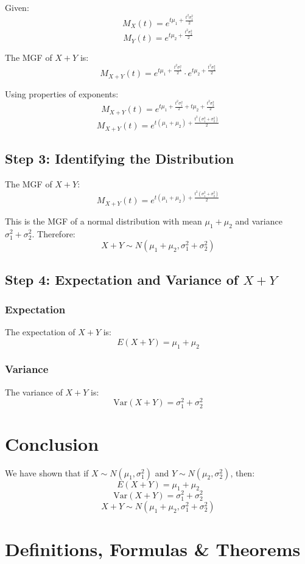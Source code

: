 \documentclass[12pt]{article}
\begin{document}
Given:
\[ M_X(t) = e^{t\mu_1 + \frac{t^2\sigma_1^2}{2}} \]
\[ M_Y(t) = e^{t\mu_2 + \frac{t^2\sigma_2^2}{2}} \]

The MGF of \( X + Y \) is:
\[ M_{X+Y}(t) = e^{t\mu_1 + \frac{t^2\sigma_1^2}{2}} \cdot e^{t\mu_2 + \frac{t^2\sigma_2^2}{2}} \]

Using properties of exponents:
\[ M_{X+Y}(t) = e^{t\mu_1 + \frac{t^2\sigma_1^2}{2} + t\mu_2 + \frac{t^2\sigma_2^2}{2}} \]
\[ M_{X+Y}(t) = e^{t(\mu_1 + \mu_2) + \frac{t^2(\sigma_1^2 + \sigma_2^2)}{2}} \]

\subsection*{Step 3: Identifying the Distribution}
The MGF of \( X + Y \):
\[ M_{X+Y}(t) = e^{t(\mu_1 + \mu_2) + \frac{t^2(\sigma_1^2 + \sigma_2^2)}{2}} \]

This is the MGF of a normal distribution with mean \( \mu_1 + \mu_2 \) and variance \( \sigma_1^2 + \sigma_2^2 \). Therefore:
\[ X + Y \sim N(\mu_1 + \mu_2, \sigma_1^2 + \sigma_2^2) \]

\subsection*{Step 4: Expectation and Variance of \( X + Y \)}
\subsubsection*{Expectation}
The expectation of \( X + Y \) is:
\[ E(X + Y) = \mu_1 + \mu_2 \]

\subsubsection*{Variance}
The variance of \( X + Y \) is:
\[ \text{Var}(X + Y) = \sigma_1^2 + \sigma_2^2 \]

\section*{Conclusion}
We have shown that if \( X \sim N(\mu_1, \sigma_1^2) \) and \( Y \sim N(\mu_2, \sigma_2^2) \), then:
\[ E(X + Y) = \mu_1 + \mu_2 \]
\[ \text{Var}(X + Y) = \sigma_1^2 + \sigma_2^2 \]
\[ X + Y \sim N(\mu_1 + \mu_2, \sigma_1^2 + \sigma_2^2) \]

\newpage
\section*{Definitions, Formulas \& Theorems}
\end{document}
